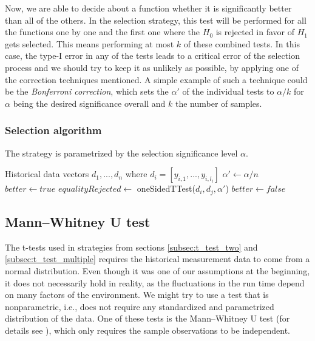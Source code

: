 Now, we are able to decide about a function whether it is significantly better than all of the others. In the selection strategy, this test will be performed for all the functions one by one and the first one where the $H_0$ is rejected in favor of $H_1$ gets selected. This means performing at most $k$ of these combined tests. In this case, the type-I error in any of the tests leads to a critical error of the selection process and we should try to keep it as unlikely as possible, by applying one of the correction techniques mentioned. A simple example of such a technique could be the \textit{Bonferroni correction}, which sets the $\alpha'$ of the individual tests to $\alpha / k$ for $\alpha$ being the desired significance overall and $k$ the number of samples.


\subsubsection{Selection algorithm}

The strategy is parametrized by the selection significance level $\alpha$.

\begin{algorithmic}[1] %
	\INPUT Historical data vectors $d_1,...,d_n$ where $d_i = [y_{i,1},...,y_{i,l_i}]$
	\State$\alpha' \gets \alpha / n$
		\State $better \gets true$
			\State $equalityRejected \gets$ oneSidedTTest($d_i, d_j, \alpha'$)
				\State $better \gets false$
			\EndIf
		\EndFor
			\State {}
		\EndIf
	\EndFor
	\State {}
	
\end{algorithmic}

\subsection{Mann–Whitney U test}
\label{subsec:u_test}

The t-tests used in strategies from sections \ref{subsec:t_test_two} and \ref{subsec:t_test_multiple} requires the historical measurement data to come from a normal distribution. Even though it was one of our assumptions at the beginning, it does not necessarily hold in reality, as the fluctuations in the run time depend on many factors of the environment. We might try to use a test that is nonparametric, i.e., does not require any standardized and parametrized distribution of the data. One of these tests is the Mann–Whitney U test (for details see \cite{weiss_introductory_2010}), which only requires the sample observations to be independent.

